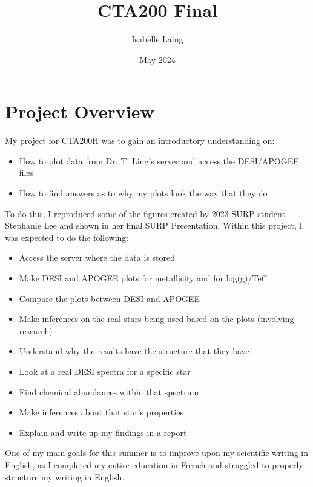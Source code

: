 \documentclass{article}
\title{CTA200 Final}
\author{Isabelle Laing}
\date{May 2024}
\begin{document}
\maketitle

\section*{Project Overview}
My project for CTA200H was to gain an introductory understanding on:
\begin{itemize}
    \item How to plot data from Dr. Ti Ling’s server and access the DESI/APOGEE files
    \item How to find answers as to why my plots look the way that they do
\end{itemize}

To do this, I reproduced some of the figures created by 2023 SURP student Stephanie Lee and shown in her final SURP Presentation. Within this project, I was expected to do the following:
\begin{itemize}
    \item Access the server where the data is stored
    \item Make DESI and APOGEE plots for metallicity and for log(g)/Teff
    \item Compare the plots between DESI and APOGEE
    \item Make inferences on the real stars being used based on the plots (involving research)
    \item Understand why the results have the structure that they have
    \item Look at a real DESI spectra for a specific star
    \item Find chemical abundances within that spectrum
    \item Make inferences about that star’s properties
    \item Explain and write up my findings in a report
\end{itemize}

One of my main goals for this summer is to improve upon my scientific writing in English, as I completed my entire education in French and struggled to properly structure my writing in English.
\end{document}
